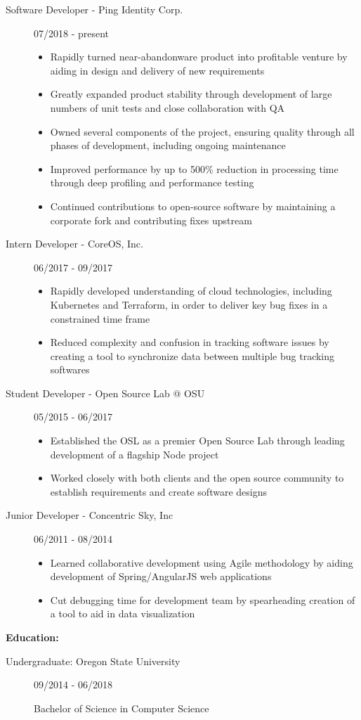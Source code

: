 \documentclass[11pt]{article}
\begin{document}
\begin{description}

\item[Software Developer - Ping Identity Corp.]
\hfill 07/2018 - present
\begin{itemize}
\item Rapidly turned near-abandonware product into profitable venture by aiding in design and delivery of new requirements
\item Greatly expanded product stability through development of large numbers of unit tests and close collaboration with QA
\item Owned several components of the project, ensuring quality through all phases of development, including ongoing maintenance
\item Improved performance by up to 500\% reduction in processing time through deep profiling and performance testing
\item Continued contributions to open-source software by maintaining a corporate fork and contributing fixes upstream
\end{itemize}

\item [Intern Developer - CoreOS, Inc.]
\hfill 06/2017 - 09/2017
\begin{itemize}
\item Rapidly developed understanding of cloud technologies, including Kubernetes and Terraform, in order to deliver key bug fixes in a constrained time frame
\item Reduced complexity and confusion in tracking software issues by creating a tool to synchronize data between multiple bug tracking softwares
\end{itemize}

\item[Student Developer - Open Source Lab @ OSU]
\hfill 05/2015 - 06/2017
\begin{itemize}
\item Established the OSL as a premier Open Source Lab through leading development of a flagship Node project
\item Worked closely with both clients and the open source community to establish requirements and create software designs
\end{itemize}

\item[Junior Developer - Concentric Sky, Inc]
\hfill 06/2011 - 08/2014
\begin{itemize}
\item Learned collaborative development using Agile methodology by aiding development of Spring/AngularJS web applications
\item Cut debugging time for development team by spearheading creation of a tool to aid in data visualization
\end{itemize}
\end{description}
\smallskip
{\huge \textbf{Education:}}
\hrulefill
\begin{description}
\item[Undergraduate: Oregon State University]
\hfill 09/2014 - 06/2018

Bachelor of Science in Computer Science
\end{description}
\end{document}
